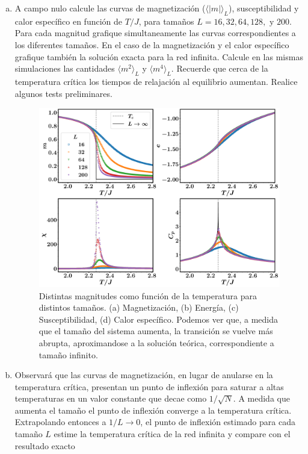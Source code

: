 \documentclass[10pt]{article}
\begin{document}
\begin{enumerate}[a)]

\item A campo nulo calcule las curvas de magnetización ($\langle |m| \rangle_L$), susceptibilidad y calor específico en función de $T/J$, para tamaños $L = 16, 32, 64, 128, \text{ y } 200$. Para cada magnitud grafique simultaneamente las curvas correspondientes a los diferentes tamaños. En el caso de la magnetización y el calor específico grafique también la solución exacta para la red infinita. Calcule en las mismas simulaciones las cantidades $\langle m^2 \rangle_L$ y $\langle m^4 \rangle_L$. Recuerde que cerca de la temperatura crítica los tiempos de relajación al equilibrio aumentan. Realice algunos tests preliminares.

\begin{figure}[ht]
\centering
\includegraphics[scale=0.27]{Fig1.pdf}
\caption{Distintas magnitudes como función de la temperatura para distintos tamaños. (a) Magnetización, (b) Energía, (c) Susceptibilidad, (d) Calor específico. Podemos ver que, a medida que el tamaño del sistema aumenta, la transición se vuelve más abrupta, aproximandose a la solución teórica, correspondiente a tamaño infinito.}
\end{figure}

\pagebreak

\item Observará que las curvas de magnetización, en lugar de anularse en la temperatura crítica, presentan un punto de inflexión para saturar a altas temperaturas en un valor constante que decae como $1/\sqrt{N}$. A medida que aumenta el tamaño el punto de inflexión converge a la temperatura crítica. Extrapolando entonces a $1/L \rightarrow 0$, el punto de inflexión estimado para cada tamaño $L$ estime la temperatura crítica de la red infinita y compare con el resultado exacto


\end{enumerate}
\end{document}
